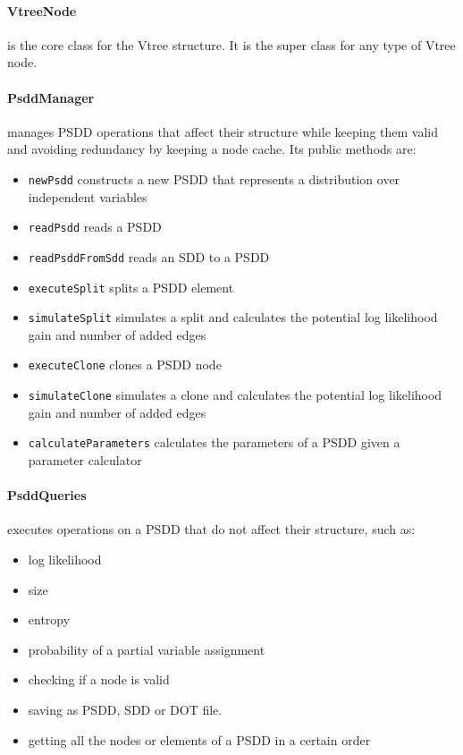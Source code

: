 \documentclass[a4paper,10pt]{article}
\begin{document}
\paragraph{VtreeNode} is the core class for the Vtree structure. It is the super class for any type of Vtree node.

\paragraph{PsddManager} manages PSDD operations that affect their structure while keeping them valid and avoiding redundancy by keeping a node cache. Its public methods are:
\begin{itemize}
 \item {\tt newPsdd} constructs a new PSDD that represents a distribution over independent variables
 \item {\tt readPsdd} reads a PSDD
 \item {\tt readPsddFromSdd} reads an SDD to a PSDD
 \item {\tt executeSplit} splits a PSDD element
 \item {\tt simulateSplit} simulates a split and calculates the potential log likelihood gain and number of added edges
 \item {\tt executeClone} clones a PSDD node
 \item {\tt simulateClone} simulates a clone and calculates the potential log likelihood gain and number of added edges
 \item {\tt calculateParameters} calculates the parameters of a PSDD given a parameter calculator
\end{itemize}


\paragraph{PsddQueries} executes operations on a PSDD that do not affect their structure, such as:
\begin{itemize}
 \item log likelihood
 \item size
 \item entropy
 \item probability of a partial variable assignment
 \item checking if a node is valid
 \item saving as PSDD, SDD or DOT file.
 \item getting all the nodes or elements of a PSDD in a certain order
\end{itemize}
\end{document}
